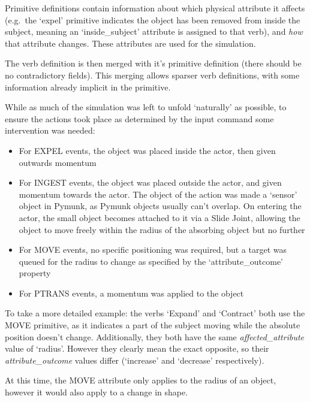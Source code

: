 \documentclass[dissertation.tex]{subfiles}
\begin{document}
    Primitive definitions contain information about which physical attribute it affects (e.g.~the `expel' primitive indicates the object has been removed from inside the subject, meaning an `inside\_subject' attribute is assigned to that verb), and \emph{how} that attribute changes. These attributes are used for the simulation.
    
    The verb definition is then merged with it's primitive definition (there should be no contradictory fields). This merging allows sparser verb definitions, with some information already implicit in the primitive.

    While as much of the simulation was left to unfold `naturally' as possible, to ensure the actions took place as determined by the input command some intervention was needed:

    \begin{itemize}
        \item For EXPEL events, the object was placed inside the actor, then given outwards momentum
        \item For INGEST events, the object was placed outside the actor, and given momentum towards the actor. The object of the action was made a `sensor' object in Pymunk, as Pymunk objects usually can't overlap. On entering the actor, the small object becomes attached to it via a Slide Joint, allowing the object to move freely within the radius of the absorbing object but no further
        \item For MOVE events, no specific positioning was required, but a target was queued for the radius to change as specified by the `attribute\_outcome' property
        \item For PTRANS events, a momentum was applied to the object
    \end{itemize}

    To take a more detailed example: the verbs `Expand' and `Contract' both use the MOVE primitive, as it indicates a part of the subject moving while the absolute position doesn't change. Additionally, they both have the same \emph{affected\_attribute} value of `radius'. However they clearly mean the exact opposite, so their \emph{attribute\_outcome} values differ (`increase' and `decrease' respectively).

    At this time, the MOVE attribute only applies to the radius of an object, however it would also apply to a change in shape.

\end{document}
